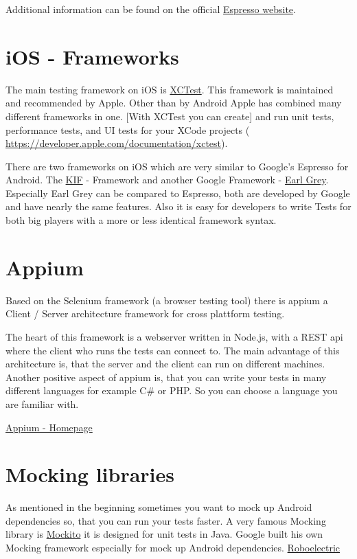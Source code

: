	Additional information can be found on the official \href{https://developer.android.com/training/testing/espresso}{Espresso website}.
	
	\section{iOS - Frameworks}
	The main testing framework on iOS is \href{https://developer.apple.com/documentation/xctest}{XCTest}. This framework is maintained and recommended by Apple. Other than by Android Apple has combined many different frameworks in one. [With XCTest you can create] and run unit tests, performance tests, and UI tests for your XCode projects ( \href{https://developer.apple.com/documentation/xctest}{https://developer.apple.com/documentation/xctest}).
	
	There are two frameworks on iOS which are very similar to Google's Espresso for Android. The \href{https://github.com/kif-framework/KIF}{KIF} - Framework and another Google Framework - \href{http://google.github.io/EarlGrey/}{Earl Grey}. Especially Earl Grey can be compared to Espresso, both are developed by Google and have nearly the same features. Also it is easy for developers to write Tests for both big players with a more or less identical framework syntax.
	
	\section{Appium}
	Based on the Selenium framework (a browser testing tool) there is appium a Client / Server architecture framework for cross plattform testing.
	
	The heart of this framework is a webserver written in Node.js, with a REST api where the client who runs the tests can connect to. The main advantage of this architecture is, that the server and the client can run on different machines. Another positive aspect of appium is, that you can write your tests in many different languages for example C\# or PHP. So you can choose a language you are familiar with.
	
	\href{http://appium.io/}{Appium - Homepage}
	
	\section{Mocking libraries}
	As mentioned in the beginning sometimes you want to mock up Android dependencies so, that you can run your tests faster. A very famous Mocking library is \href{http://site.mockito.org/}{Mockito} it is designed for unit tests in Java. Google built his own Mocking framework especially for mock up Android dependencies. \href{http://roboelectric.org}{Roboelectric}
	
